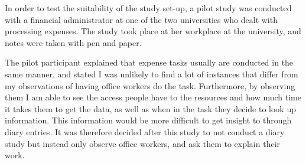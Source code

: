 In order to test the suitability of the study set-up, a pilot study was conducted with a financial administrator at one of the two universities who dealt with processing expenses. The study took place at her workplace at the university, and notes were taken with pen and paper. 

The pilot participant explained that expense tasks usually are conducted in the same manner, and stated I was unlikely to find a lot of instances that differ from my observations of having office workers do the task.
Furthermore, by observing them I am able to see the access people have to the resources and how much time it takes them to get the data, as well as when in the task they decide to look up information. This information would be more difficult to get insight to through diary entries. It was therefore decided after this study to not conduct a diary study but instead only observe office workers, and ask them to explain their work.

